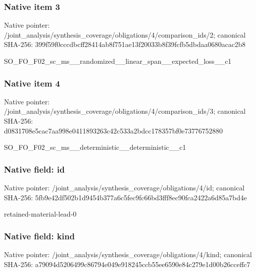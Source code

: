 \documentclass[10pt,a4paper]{article}
\begin{document}
\subsubsection{Native item 3}
Native pointer: /joint\_\allowbreak{}analysis/synthesis\_\allowbreak{}coverage/obligations/4/comparison\_\allowbreak{}ids/2; canonical SHA-256: 399f59f0cccdbcff28414ab8f751ae13f20033b8f39fcfb5dbdaa0680acac2b8

\begingroup\raggedright\sloppy SO\_\allowbreak{}FO\_\allowbreak{}F02\_\allowbreak{}sc\_\allowbreak{}ms\_\allowbreak{}\_\allowbreak{}randomized\_\allowbreak{}\_\allowbreak{}linear\_\allowbreak{}span\_\allowbreak{}\_\allowbreak{}expected\_\allowbreak{}loss\_\allowbreak{}\_\allowbreak{}c1\par\endgroup

\subsubsection{Native item 4}
Native pointer: /joint\_\allowbreak{}analysis/synthesis\_\allowbreak{}coverage/obligations/4/comparison\_\allowbreak{}ids/3; canonical SHA-256: d0831708e5cac7aa998e0411893263c42c533a2bdcc178357bf0e73776752880

\begingroup\raggedright\sloppy SO\_\allowbreak{}FO\_\allowbreak{}F02\_\allowbreak{}sc\_\allowbreak{}ms\_\allowbreak{}\_\allowbreak{}deterministic\_\allowbreak{}\_\allowbreak{}deterministic\_\allowbreak{}\_\allowbreak{}c1\par\endgroup

\subsubsection{Native field: id}
Native pointer: /joint\_\allowbreak{}analysis/synthesis\_\allowbreak{}coverage/obligations/4/id; canonical SHA-256: 5fb9e42df502b1d9454b377a6c5fec9fc66bd3fff8ec90fca2422a6d85a7bd4e

\begingroup\raggedright\sloppy retained-material-lead-0\par\endgroup

\subsubsection{Native field: kind}
Native pointer: /joint\_\allowbreak{}analysis/synthesis\_\allowbreak{}coverage/obligations/4/kind; canonical SHA-256: a79094d5206499c86794e049e918245ccb55ee6590e84c279e1d00b26cceffc7
\end{document}
